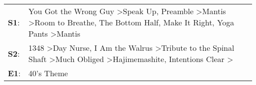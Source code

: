 \begin{supertabular}{p{0.03\textwidth}p{0.92\textwidth}}
 \textbf{S1}:  &  You Got the Wrong Guy\textsuperscript{} \textgreater \enspace Speak Up\textsuperscript{}, \enspace Preamble\textsuperscript{} \textgreater \enspace Mantis\textsuperscript{} \textgreater \enspace Room to Breathe\textsuperscript{}, \enspace The Bottom Half\textsuperscript{}, \enspace Make It Right\textsuperscript{}, \enspace Yoga Pants\textsuperscript{} \textgreater \enspace Mantis\textsuperscript{}  \enspace  \\
 \textbf{S2}:  &                     1348\textsuperscript{} \textgreater \enspace Day Nurse\textsuperscript{}, \enspace I Am the Walrus\textsuperscript{} \textgreater \enspace Tribute to the Spinal Shaft\textsuperscript{} \textgreater \enspace Much Obliged\textsuperscript{} \textgreater \enspace Hajimemashite\textsuperscript{}, \enspace Intentions Clear\textsuperscript{} \textgreater {}\textsuperscript{}  \enspace  \\
 \textbf{E1}:  &                                                                                                                                                                                                                                                                                                                                                                                      40's Theme\textsuperscript{}  \enspace  \\
\end{supertabular}
